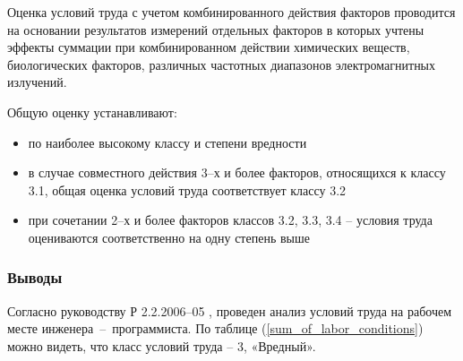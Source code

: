 Оценка условий труда с учетом комбинированного действия факторов проводится на
основании результатов измерений отдельных факторов в которых учтены эффекты
суммации при комбинированном действии химических веществ, биологических факторов,
различных частотных диапазонов электромагнитных излучений.

Общую оценку устанавливают:

\begin{itemize}
    \item   по наиболее высокому классу и степени вредности
    \item   в случае совместного действия 3--х и более факторов, относящихся к классу
            3.1, общая оценка условий труда соответствует классу 3.2
    \item   при сочетании 2--х и более факторов классов 3.2, 3.3, 3.4 -- условия
            труда оцениваются соответственно на одну степень выше
\end{itemize}



\subsubsection{Выводы}

Согласно руководству Р 2.2.2006--05 \cite{ecology_man_2_2_2006_05}, проведен анализ
условий труда на рабочем месте инженера~--~программиста. По таблице
(\ref{sum_of_labor_conditions}) можно видеть, что класс условий труда – 3, «Вредный».
